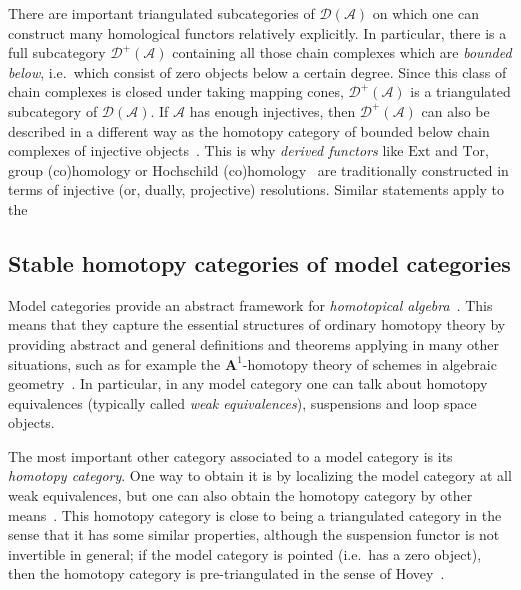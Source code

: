 \documentclass{amsproc}
\theoremstyle{definition}
\begin{document}
There are important triangulated subcategories of ${\mathcal{D}}({\mathcal{A}})$ on which one can construct many homological functors relatively explicitly. In particular, there is a full subcategory ${\mathcal{D}}^+({\mathcal{A}})$ containing all those chain complexes which are \emph{bounded below}, i.e.~which consist of zero objects below a certain degree. Since this class of chain complexes is closed under taking mapping cones, ${\mathcal{D}}^+({\mathcal{A}})$ is a triangulated subcategory of ${\mathcal{D}}({\mathcal{A}})$. If ${\mathcal{A}}$ has enough injectives, then ${\mathcal{D}}^+({\mathcal{A}})$ can also be described in a different way as the homotopy category of bounded below chain complexes of injective objects~\cite[Thm.~III.5.21]{GM}. This is why \emph{derived functors} like $\mathrm{Ext}$ and $\mathrm{Tor}$, group (co)homology or Hochschild (co)homology~\cite{Weibel} are traditionally constructed in terms of injective (or, dually, projective) resolutions. Similar statements apply to the 

\subsection{Stable homotopy categories of model categories}
\label{model}

Model categories provide an abstract framework for \emph{homotopical algebra}~\cite{Quillen,Hov}. This means that they capture the essential structures of ordinary homotopy theory by providing abstract and general definitions and theorems applying in many other situations, such as for example the $\mathbf{A}^1$-homotopy theory of schemes in algebraic geometry~\cite{MV}. In particular, in any model category one can talk about homotopy equivalences (typically called \emph{weak equivalences}), suspensions and loop space objects.

The most important other category associated to a model category is its \emph{homotopy category}. One way to obtain it is by localizing the model category at all weak equivalences, but one can also obtain the homotopy category by other means~\cite[Thm.~1.2.10]{Hov}. This homotopy category is close to being a triangulated category in the sense that it has some similar properties, although the suspension functor is not invertible in general; if the model category is pointed (i.e.~has a zero object), then the homotopy category is pre-triangulated in the sense of Hovey~\cite[Ch.~6]{Hov}.
\end{document}
